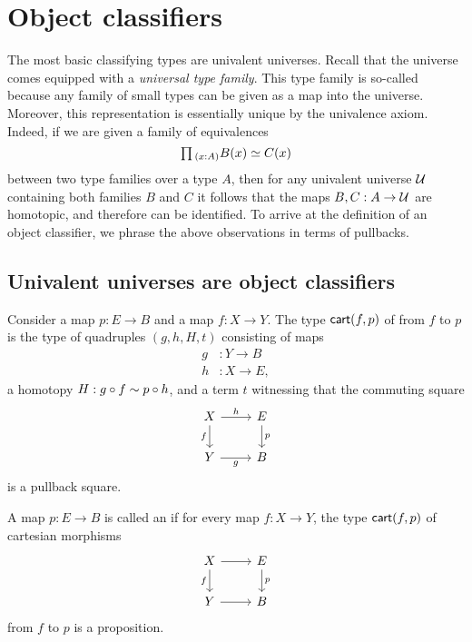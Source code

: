 \section{Object classifiers}

The most basic classifying types are univalent universes. Recall that the universe comes equipped with a \emph{universal type family}. This type family is so-called because any family of small types can be given as a map into the universe. Moreover, this representation is essentially unique by the univalence axiom. Indeed, if we are given a family of equivalences
\begin{equation*}
  \prd{x:A}B(x)\simeq C(x)
\end{equation*}
between two type families over a type $A$, then for any univalent universe $\mathcal{U}$ containing both families $B$ and $C$ it follows that the maps $B,C:A\to\mathcal{U}$ are homotopic, and therefore can be identified. To arrive at the definition of an object classifier, we phrase the above observations in terms of pullbacks.

\subsection{Univalent universes are object classifiers}

\begin{defn}
  Consider a map $p:E\to B$ and a map $f:X\to Y$. The type $\mathsf{cart}(f,p)$ of  from $f$ to $p$ is the type of quadruples $(g,h,H,t)$ consisting of maps
  \begin{align*}
    g & : Y\to B \\
    h & : X\to E,
  \end{align*}
  a homotopy $H:g\circ f\sim p\circ h$, and a term $t$ witnessing that the commuting square
  \begin{equation*}
    \begin{tikzcd}
      X \arrow[r,"h"] \arrow[d,swap,"f"] & E \arrow[d,"p"] \\
      Y \arrow[r,swap,"g"] & B
    \end{tikzcd}
  \end{equation*}
  is a pullback square.
\end{defn}

\begin{defn}
  A map $p:E\to B$ is called an  if for every map $f:X\to Y$, the type $\mathsf{cart}(f,p)$ of cartesian morphisms
  \begin{equation*}
    \begin{tikzcd}
      X \arrow[r] \arrow[d,swap,"f"] & E \arrow[d,"p"] \\
      Y \arrow[r] & B
    \end{tikzcd}
  \end{equation*}
  from $f$ to $p$ is a proposition. 
\end{defn}

